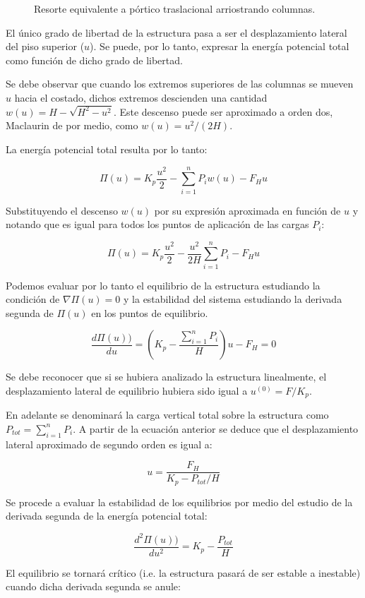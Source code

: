 \begin{figure}[htb]
  \centering
  \def\svgwidth{0.6\textwidth}
  
	\caption{Resorte equivalente a pórtico traslacional arriostrando columnas.}
	\label{fig:globales2}
\end{figure}

El único grado de libertad de la estructura pasa a ser el desplazamiento lateral del piso superior ($u$). Se puede, por lo tanto, expresar la energía potencial total como función de dicho grado de libertad.

Se debe observar que cuando los extremos superiores de las columnas se mueven $u$ hacia el costado, dichos extremos descienden una cantidad $w(u)=H-\sqrt{H^2-u^2}$. Este descenso puede ser aproximado a orden dos, Maclaurin de por medio, como $w(u)=u^2/(2H)$.

La energía potencial total resulta por lo tanto:

$$\Pi(u)=K_p \frac{u^2}{2} -\sum_{i=1}^n P_i w(u) - F_H u$$

Substituyendo el descenso $w(u)$ por su expresión aproximada en función de $u$ y notando que es igual para todos los puntos de aplicación de las cargas $P_i$:

$$\Pi(u)=K_p \frac{u^2}{2} -\frac {u^2}{2H} \sum_{i=1}^n P_i - F_H u$$

Podemos evaluar por lo tanto el equilibrio de la estructura estudiando la condición de $\nabla \Pi(u)=0$ y la estabilidad del sistema estudiando la derivada segunda de $\Pi(u)$ en los puntos de equilibrio.

$$\frac{d \Pi(u))}{d u} = \left(K_p-\frac{\sum_{i=1}^n P_i}{H}\right)u - F_H = 0$$

Se debe reconocer que si se hubiera analizado la estructura linealmente, el desplazamiento lateral de equilibrio hubiera sido igual a $u^{(0)}=F/K_p$.

En adelante se denominará la carga vertical total sobre la estructura como $P_{tot}=\sum_{i=1}^n P_i$. A partir de la ecuación anterior se deduce que el desplazamiento lateral aproximado de segundo orden es igual a:

$$u=\frac{F_H}{K_p - P_{tot}/H}$$

Se procede a evaluar la estabilidad de los equilibrios por medio del estudio de la derivada segunda de la energía potencial total:

$$\frac{d^2 \Pi(u))}{d u^2} = K_p-\frac{P_{tot}}{H}$$

El equilibrio se tornará crítico (i.e. la estructura pasará de ser estable a inestable) cuando dicha derivada segunda se anule:

